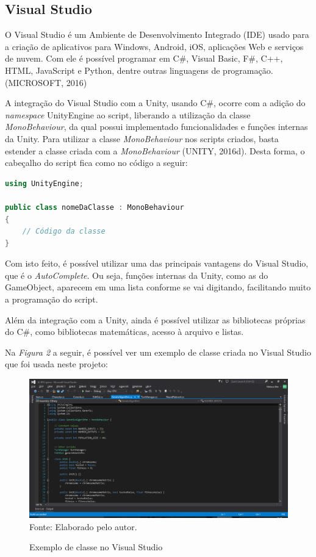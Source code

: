 \documentclass[12pt,a4paper]{article}
\newcommand{\source}[1]{\small Fonte: {#1}}
\begin{document}
	\subsection{Visual Studio}
		O Visual Studio é um Ambiente de Desenvolvimento Integrado (IDE) usado para a criação de aplicativos para Windows, Android, iOS, aplicações Web e serviços de nuvem.
		Com ele é possível programar em C\#, Visual Basic, F\#, C++, HTML, JavaScript e Python, dentre outras linguagens de programação. (MICROSOFT, 2016)
		
		A integração do Visual Studio com a Unity, usando C\#, ocorre com a adição do \textit{namespace} UnityEngine ao script,
		liberando a utilização da classe \textit{MonoBehaviour},
		da qual possui implementado funcionalidades e funções internas da Unity.
		Para utilizar a classe \textit{MonoBehaviour} nos scripts criados,
		basta estender a classe criada com a \textit{MonoBehaviour} (UNITY, 2016d).
		Desta forma, o cabeçalho do script fica como no código a seguir:
		
		\begin{lstlisting}[language=C++]
using UnityEngine;

public class nomeDaClasse : MonoBehaviour
{
	// Código da classe
}\end{lstlisting}
		
		Com isto feito, é possível utilizar uma das principais vantagens do Visual Studio,
		que é o \textit{AutoComplete}.
		Ou seja, funções internas da Unity, como as do GameObject, aparecem em uma lista conforme se vai digitando,
		facilitando muito a programação do script.
		
		Além da integração com a Unity,
		ainda é possível utilizar as bibliotecas próprias do C\#,
		como bibliotecas matemáticas, acesso à arquivo e listas.
		
		Na \textit{Figura 2} a seguir, é possível ver um exemplo de classe criada no Visual Studio que foi usada neste projeto:
		
		\begin{figure}[ht!]
			\label{visualStudio}
			\caption{Exemplo de classe no Visual Studio}
			\centering
			\includegraphics[scale=0.4]{InterfaceVisualStudio.png}\\
			\vspace{0.5mm}
			\source{Elaborado pelo autor.}
		\end{figure}
		
\end{document}
